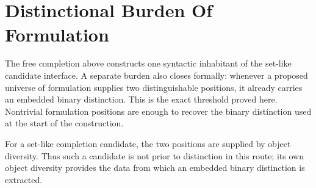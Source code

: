 \documentclass[11pt]{article}
\begin{document}
\begin{code}
\AgdaSymbol{:}\<%
\\
\>[0][@{}l@{\AgdaIndent{0}}]%
\>[2]\<%
\\
\>[0]\AgdaSpace{}%
\AgdaSymbol{=}\AgdaSpace{}%
\<%
\\
\>[0][@{}l@{\AgdaIndent{0}}]%
\>[2]\AgdaSymbol{\{}\AgdaSpace{}%
\AgdaSpace{}%
\AgdaSymbol{=}\AgdaSpace{}%
\<%
\\
%
\>[2]\AgdaSymbol{;}\AgdaSpace{}%
\AgdaSpace{}%
\AgdaSymbol{=}\AgdaSpace{}%
\<%
\\
%
\>[2]\AgdaSymbol{;}\AgdaSpace{}%
\AgdaSpace{}%
\AgdaSymbol{=}\AgdaSpace{}%
\<%
\\
%
\>[2]\AgdaSymbol{;}\AgdaSpace{}%
\AgdaSpace{}%
\AgdaSymbol{=}\AgdaSpace{}%
\<%
\\
%
\>[2]\AgdaSymbol{\}}\<%
\end{code}

\section{Distinctional Burden Of Formulation}

The free completion above constructs one syntactic inhabitant of the
set-like candidate interface.  A separate burden also closes formally:
whenever a proposed universe of formulation supplies two distinguishable
positions, it already carries an embedded binary distinction.  This is
the exact threshold proved here.  Nontrivial formulation positions are
enough to recover the binary distinction used at the start of the
construction.

For a set-like completion candidate, the two positions are supplied by
object diversity.  Thus such a candidate is not prior to distinction in
this route; its own object diversity provides the data from which an
embedded binary distinction is extracted.
\end{document}
